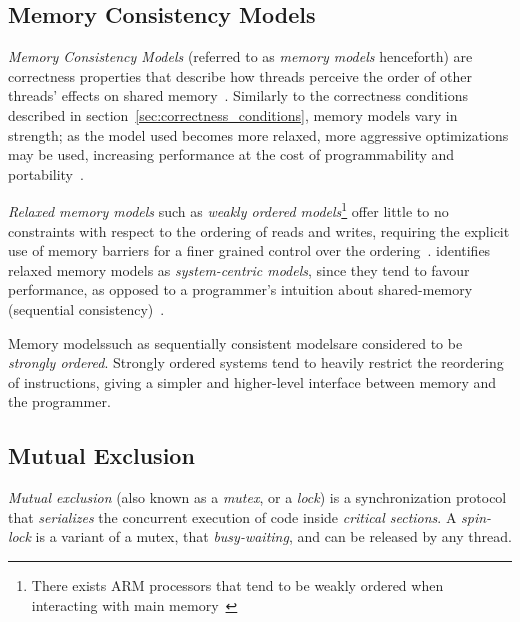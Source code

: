 \subsection{Memory Consistency Models}
\emph{Memory Consistency Models} (referred to as \emph{memory models} henceforth) are correctness properties that describe how
threads perceive the order of other threads' effects on shared
memory~\citep[Section~3.7]{herlihy2020art}. Similarly to the correctness
conditions described in section~\ref{sec:correctness_conditions}, memory
models vary in strength; as the model used becomes more relaxed, more aggressive
optimizations may be used, increasing performance at the cost of
programmability and portability~\citep{gharachorloo1996consistency}.

\emph{Relaxed memory models} such as \emph{weakly ordered
models}\footnote{There exists ARM processors that tend to be weakly ordered when
interacting with main memory~\citep[Section~A3.5.5]{arm2022architecture}} offer
little to no
constraints with respect to the ordering of reads and writes, requiring the
explicit use of memory barriers for a finer grained control over the ordering~\citep{gharachorloo1996consistency}. \citeauthor{gharachorloo1996consistency} identifies relaxed
memory models as \emph{system-centric models}, since they tend to favour
performance, as opposed to a programmer's intuition about shared-memory
(sequential consistency)~\citep{gharachorloo1996consistency}.

Memory models\textemdash such as sequentially consistent models\textemdash are considered to be
\emph{stron\-gly ordered}. Strongly ordered systems tend to
heavily restrict the reordering of instructions, giving a simpler and
higher-level interface between memory and the programmer. 

\subsection{Mutual Exclusion}
\emph{Mutual exclusion} (also known as a \emph{mutex}, or a \emph{lock}) is a
synchronization protocol that \emph{serializes} the concurrent execution of
code inside \emph{critical sections}. A \emph{spin-lock} is a variant of a
mutex, that \emph{busy-waiting}, and can be released by any thread.

